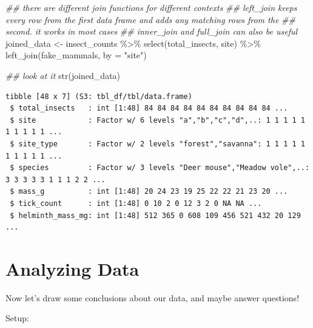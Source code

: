 \documentclass[
  letterpaper,
  DIV=11,
  numbers=noendperiod]{scrreprt}
\newenvironment{Shaded}{\begin{snugshade}}{\end{snugshade}}
\newcommand{\AttributeTok}[1]{\textcolor[rgb]{0.40,0.45,0.13}{#1}}
\newcommand{\DocumentationTok}[1]{\textcolor[rgb]{0.37,0.37,0.37}{\textit{#1}}}
\newcommand{\FunctionTok}[1]{\textcolor[rgb]{0.28,0.35,0.67}{#1}}
\newcommand{\NormalTok}[1]{\textcolor[rgb]{0.00,0.23,0.31}{#1}}
\newcommand{\OtherTok}[1]{\textcolor[rgb]{0.00,0.23,0.31}{#1}}
\newcommand{\SpecialCharTok}[1]{\textcolor[rgb]{0.37,0.37,0.37}{#1}}
\newcommand{\StringTok}[1]{\textcolor[rgb]{0.13,0.47,0.30}{#1}}
\begin{document}
\begin{Shaded}
\begin{Highlighting}[]
\DocumentationTok{\#\# there are different join functions for different contexts}
\DocumentationTok{\#\# left\_join keeps every row from the first data frame and adds any matching rows from the}
\DocumentationTok{\#\# second. it works in most cases}
\DocumentationTok{\#\# inner\_join and full\_join can also be useful}
\NormalTok{joined\_data }\OtherTok{\textless{}{-}}\NormalTok{ insect\_counts }\SpecialCharTok{\%\textgreater{}\%}
  \FunctionTok{select}\NormalTok{(total\_insects, site) }\SpecialCharTok{\%\textgreater{}\%}
  \FunctionTok{left\_join}\NormalTok{(fake\_mammals, }\AttributeTok{by =} \StringTok{"site"}\NormalTok{)}

\DocumentationTok{\#\# look at it}
\FunctionTok{str}\NormalTok{(joined\_data)}
\end{Highlighting}
\end{Shaded}

\begin{verbatim}
tibble [48 x 7] (S3: tbl_df/tbl/data.frame)
 $ total_insects   : int [1:48] 84 84 84 84 84 84 84 84 84 84 ...
 $ site            : Factor w/ 6 levels "a","b","c","d",..: 1 1 1 1 1 1 1 1 1 1 ...
 $ site_type       : Factor w/ 2 levels "forest","savanna": 1 1 1 1 1 1 1 1 1 1 ...
 $ species         : Factor w/ 3 levels "Deer mouse","Meadow vole",..: 3 3 3 3 3 1 1 1 2 2 ...
 $ mass_g          : int [1:48] 20 24 23 19 25 22 22 21 23 20 ...
 $ tick_count      : int [1:48] 0 10 2 0 12 3 2 0 NA NA ...
 $ helminth_mass_mg: int [1:48] 512 365 0 608 109 456 521 432 20 129 ...
\end{verbatim}

\chapter{Analyzing Data}\label{analyzing-data}

Now let's draw some conclusions about our data, and maybe answer
questions!

Setup:
\end{document}
